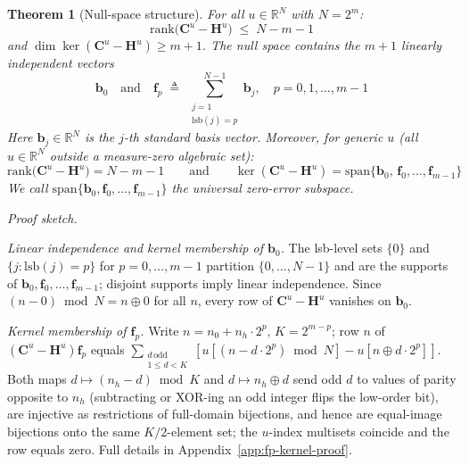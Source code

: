 \documentclass[10pt,a4paper]{amsart}
\newtheorem{theorem}{Theorem}
\begin{document}
\begin{theorem}[Null-space structure]\label{thm:null-space}
For all $u \in \mathbb{R}^N$ with $N = 2^m$:
\begin{equation}
    \mathrm{rank}\bigl(\mathbf{C}^u - \mathbf{H}^u\bigr) \;\leq\; N - m - 1
\end{equation}
and $\dim\ker(\mathbf{C}^u - \mathbf{H}^u) \geq m+1$. The null space contains the $m+1$ linearly independent vectors
\begin{equation}
    \mathbf{b}_0 \quad\text{and}\quad \mathbf{f}_p \;\triangleq\; \sum_{\substack{j=1 \\ \mathrm{lsb}(j)=p}}^{N-1} \mathbf{b}_j, \quad p = 0, 1, \ldots, m-1
\end{equation}
Here $\mathbf{b}_j \in \mathbb{R}^N$ is the $j$-th standard basis vector. Moreover, for generic $u$ (all $u \in \mathbb{R}^N$ outside a measure-zero algebraic set):
\begin{equation}
    \mathrm{rank}\bigl(\mathbf{C}^u - \mathbf{H}^u\bigr) = N - m - 1
    \qquad\text{and}\qquad
    \ker(\mathbf{C}^u - \mathbf{H}^u) = \mathrm{span}\{\mathbf{b}_0,\,\mathbf{f}_0,\ldots,\mathbf{f}_{m-1}\}
\end{equation}
We call $\mathrm{span}\{\mathbf{b}_0,\mathbf{f}_0,\ldots,\mathbf{f}_{m-1}\}$ the \emph{universal zero-error subspace}.
\end{theorem}


\noindent\textit{Proof sketch.}

\smallskip
\noindent\textit{Linear independence and kernel membership of $\mathbf{b}_0$.} The lsb-level sets $\{0\}$ and $\{j:\mathrm{lsb}(j)=p\}$ for $p=0,\ldots,m-1$ partition $\{0,\ldots,N-1\}$ and are the supports of $\mathbf{b}_0,\mathbf{f}_0,\ldots,\mathbf{f}_{m-1}$; disjoint supports imply linear independence. Since $(n-0)\bmod N = n\oplus 0$ for all $n$, every row of $\mathbf{C}^u-\mathbf{H}^u$ vanishes on $\mathbf{b}_0$.

\smallskip
\noindent\textit{Kernel membership of $\mathbf{f}_p$.} Write $n=n_0+n_h\cdot 2^p$, $K=2^{m-p}$; row $n$ of $(\mathbf{C}^u-\mathbf{H}^u)\mathbf{f}_p$ equals $\sum_{\substack{d\,\mathrm{odd}\\1\le d<K}}[u[(n-d\cdot 2^p)\bmod N]-u[n\oplus d\cdot 2^p]]$. Both maps $d\mapsto(n_h-d)\bmod K$ and $d\mapsto n_h\oplus d$ send odd $d$ to values of parity opposite to $n_h$ (subtracting or XOR-ing an odd integer flips the low-order bit), are injective as restrictions of full-domain bijections, and hence are equal-image bijections onto the same $K/2$-element set; the $u$-index multisets coincide and the row equals zero. Full details in Appendix~\ref{app:fp-kernel-proof}.
\end{document}
